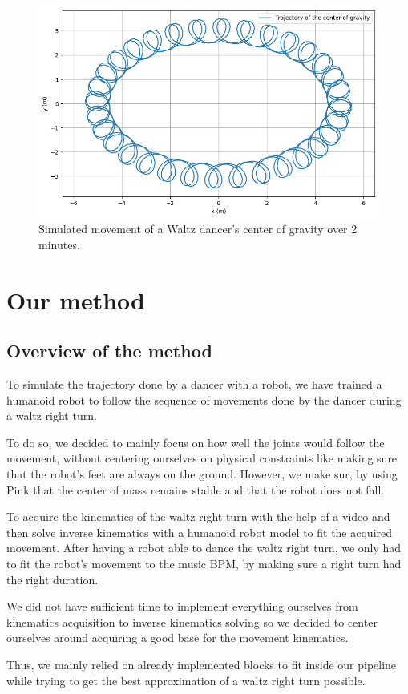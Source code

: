 \documentclass{amsart}
\theoremstyle{definition}
\theoremstyle{plain}
\begin{document}
\begin{figure}
  \centering
  \includegraphics[width = 0.5 \columnwidth]{img/waltz_cog_movement.png} 
  \caption{Simulated movement of a Waltz dancer's center of gravity over 2 minutes.}\label{fig:cog_movement}
\end{figure}


\section{Our method}

\subsection{Overview of the method}
To simulate the trajectory done by a dancer with a robot, we have trained a humanoid robot to follow the sequence of movements done by the dancer during a waltz right turn.

To do so, we decided to mainly focus on how well the joints would follow the movement, without centering ourselves on physical constraints like making sure that the robot's feet are always on the ground.
However, we make sur, by using Pink \cite{pink2024} that the center of mass remains stable and that the robot does not fall.

To acquire the kinematics of the waltz right turn with the help of a video and then solve inverse kinematics with a humanoid robot model to fit the acquired movement. 
After having a robot able to dance the waltz right turn, we only had to fit the robot's movement to the music BPM, by making sure a right turn had the right duration.

We did not have sufficient time to implement everything ourselves from kinematics acquisition to inverse kinematics solving so we decided to center ourselves around acquiring a good base for the movement kinematics. 

Thus, we mainly relied on already implemented blocks to fit inside our pipeline while trying to get the best approximation of a waltz right turn possible.
\end{document}
